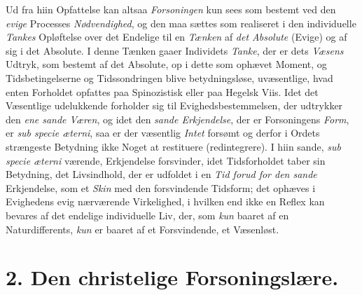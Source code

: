Ud fra hiin Opfattelse kan altsaa \emph{Forsoningen} kun sees som bestemt ved
den \emph{evige} Processes \emph{Nødvendighed}, og den maa sættes som realiseret
i den individuelle \emph{Tankes} Opløftelse over det Endelige til en
\emph{Tænken} af \emph{det Absolute} (Evige) og af sig i det Absolute. I denne
Tænken gaaer Individets \emph{Tanke}, der er dets \emph{Væsens} Udtryk, som
bestemt af det Absolute, op i dette som ophævet Moment, og Tidsbetingelserne og
Tidssondringen blive betydningsløse, uvæsentlige, hvad enten Forholdet opfattes
paa Spinozistisk eller paa Hegelsk Viis. Idet det Væsentlige udelukkende
forholder sig til Evighedsbestemmelsen, der udtrykker den \emph{ene sande
Væren}, og idet den \emph{sande Erkjendelse}, der er Forsoningens \emph{Form},
er \emph{\textit{sub specie æterni}}, saa er der væsentlig \emph{Intet} forsømt
og derfor i Ordets strængeste Betydning ikke Noget at restituere
(redintegrere). I hiin sande, \textit{sub specie æterni} værende, Erkjendelse
forsvinder, idet Tidsforholdet taber sin Betydning, det Livsindhold, der er
udfoldet i en \emph{Tid forud for den sande} Erkjendelse, som et \emph{Skin} med
den forsvindende Tidsform; det ophæves i Evighedens evig nærværende
Virkelighed, i hvilken end ikke en Reflex kan bevares af det endelige
individuelle Liv, der, som \emph{kun} baaret af en Naturdifferents, \emph{kun}
er baaret af et Forsvindende, et Væsenløst.

\section*{2. Den christelige Forsoningslære.}


